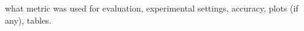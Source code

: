what metric was used for evaluation, experimental settings, accuracy, plots (if any), tables.
\clearpage